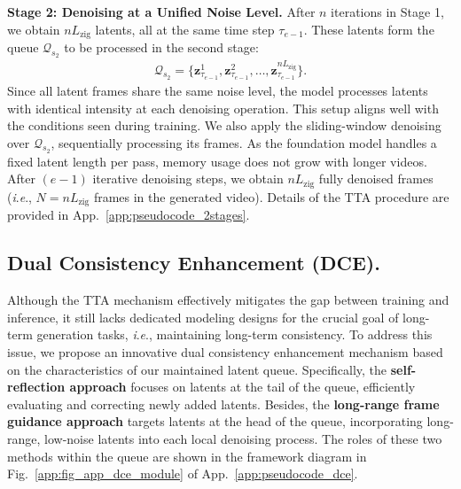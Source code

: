 \documentclass{article}
\theoremstyle{plain}
\theoremstyle{definition}
\theoremstyle{remark}
\newcommand{\ie}{\textit{i}.\textit{e}.}
\begin{document}
\textbf{Stage 2: Denoising at a Unified Noise Level.}
After $n$ iterations in Stage 1, we obtain $nL_{\mathrm{zig}}$ latents, all at the same time step $\tau_{e-1}$. These latents form the queue $\mathcal{Q}_{s_2}$ to be processed in the second stage:
\begin{align}
\mathcal{Q}_{s_2} = \{\mathbf{z}^1_{\tau_{e-1}}, \mathbf{z}^2_{\tau_{e-1}}, \ldots, \mathbf{z}^{nL_{\mathrm{zig}}}_{\tau_{e-1}}\}.
\end{align}
Since all latent frames share the same noise level, the model processes latents with identical intensity at each denoising operation. This setup aligns well with the conditions seen during training. 
We also apply the sliding-window denoising over $\mathcal{Q}_{s_2}$, sequentially processing its frames. As the foundation model handles a fixed latent length per pass, memory usage does not grow with longer videos.  
After $(e-1)$ iterative denoising steps, we obtain $nL_{\mathrm{zig}}$ fully denoised frames (\ie, $N = nL_{\mathrm{zig}}$ frames in the generated video).  
Details of the TTA procedure are provided in App.~\ref{app:pseudocode_2stages}.




\subsection{Dual Consistency Enhancement (DCE).}
\label{sec_3_3}
Although the TTA mechanism effectively mitigates the gap between training and inference, it still lacks dedicated modeling designs for the crucial goal of long-term generation tasks, \ie, maintaining long-term consistency.
To address this issue, we propose an innovative dual consistency enhancement mechanism based on the characteristics of our maintained latent queue.
Specifically, the \textbf{self-reflection approach} focuses on latents at the tail of the queue, efficiently evaluating and correcting newly added latents. 
Besides, the \textbf{long-range frame guidance approach} targets latents at the head of the queue, incorporating long-range, low-noise latents into each local denoising process.
The roles of these two methods within the queue are shown in the framework diagram in Fig.~\ref{app:fig_app_dce_module} of App.~\ref{app:pseudocode_dce}.



\end{document}

